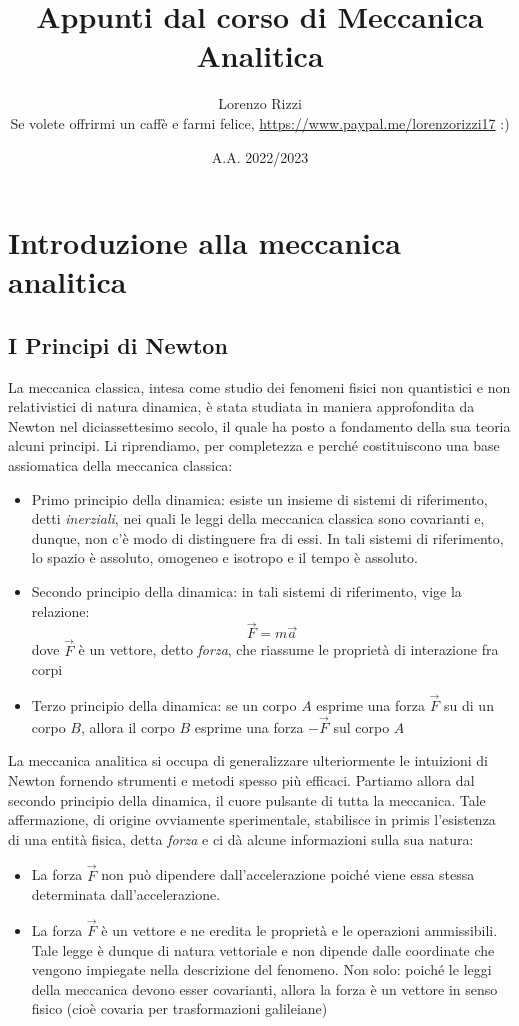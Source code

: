 \documentclass[a4paper,openany]{article}
\title{Appunti dal corso di Meccanica Analitica }
\author{Lorenzo Rizzi
\\
Se volete offrirmi un caffè e farmi felice, \url{https://www.paypal.me/lorenzorizzi17} :)  }
\date{A.A. 2022/2023 }
\begin{document}
	\newpage
	\maketitle
	\newpage
	\tableofcontents
	\section{Introduzione alla meccanica analitica}
	\subsection{I Principi di Newton}
	La meccanica classica, intesa come studio dei fenomeni fisici non quantistici e non relativistici di natura dinamica, è stata studiata in maniera approfondita da Newton nel diciassettesimo secolo, il quale ha posto a fondamento della sua teoria alcuni principi. Li riprendiamo, per completezza e perché costituiscono una base assiomatica della meccanica classica:
	\begin{itemize}
		\item  Primo principio della dinamica: esiste un insieme di sistemi di riferimento, detti \textit{inerziali}, nei quali le leggi della meccanica classica sono covarianti e, dunque, non c'è modo di distinguere fra di essi. In tali sistemi di riferimento, lo spazio è assoluto, omogeneo e isotropo e il tempo è assoluto.
		\item Secondo principio della dinamica: in tali sistemi di riferimento, vige la relazione:
		$$
		\vec{F} = m\vec{a}
		$$
		dove $\vec{F}$ è un vettore, detto \textit{forza}, che riassume le proprietà di interazione fra corpi
		\item Terzo principio della dinamica: se un corpo $A$ esprime una forza $\vec{F}$ su di un corpo $B$, allora il corpo $B$ esprime una forza $-\vec{F}$ sul corpo $A$
	\end{itemize}
	La meccanica analitica si occupa di generalizzare ulteriormente le intuizioni di Newton fornendo strumenti e metodi spesso più efficaci.
	Partiamo allora dal secondo principio della dinamica, il cuore pulsante di tutta la meccanica. Tale affermazione, di origine ovviamente sperimentale, stabilisce in primis l'esistenza di una entità fisica, detta \textit{forza} e ci dà alcune informazioni sulla sua natura:
	\begin{itemize}
		\item La forza $\vec{F}$ non può dipendere dall'accelerazione poiché viene essa stessa determinata dall'accelerazione. 
		\item La forza $\vec{F}$ è un vettore e ne eredita le proprietà e le operazioni ammissibili. Tale legge è dunque di natura vettoriale e non dipende dalle coordinate che vengono impiegate nella descrizione del fenomeno. Non solo: poiché le leggi della meccanica devono esser covarianti, allora la forza è un vettore in senso fisico (cioè covaria per trasformazioni galileiane)	
	\end{itemize}
	
\end{document}
